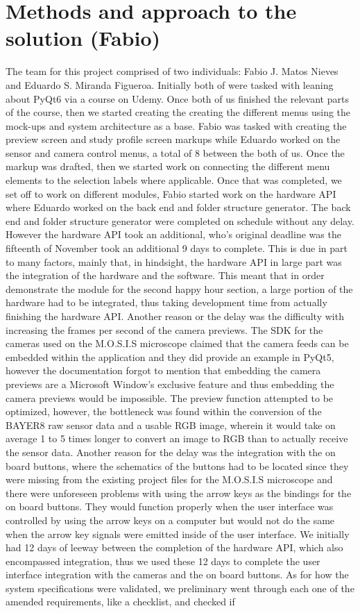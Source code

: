 \section{Methods and approach to the solution (Fabio)}
The team for this project comprised of two individuals: Fabio J. Matos Nieves and Eduardo S. Miranda Figueroa. Initially both of were tasked with leaning about PyQt6 via a course on Udemy. Once both of us finished the relevant parts of the course, then we started creating the creating the different menus using the mock-ups and system architecture as a base. Fabio was tasked with creating the preview screen and study profile screen markups while Eduardo worked on the sensor and camera control menus, a total of 8 between the both of us. Once the markup was drafted, then we started work on connecting the different menu elements to the selection labels where applicable. Once that was completed, we set off to work on different modules, Fabio started work on the hardware API where Eduardo worked on the back end and folder structure generator. The back end and folder structure generator were completed on schedule without any delay. However the hardware API took an additional, who's original deadline was the fifteenth of November took an additional 9 days to complete. This is due in part to many factors, mainly that, in hindsight, the hardware API in large part was the integration of the hardware and the software. This meant that in order demonstrate the module for the second happy hour section, a large portion of the hardware had to be integrated, thus taking development time from actually finishing the hardware API. Another reason or the delay was the difficulty with increasing the frames per second of the camera previews. The SDK for the cameras used on the M.O.S.I.S microscope claimed that the camera feeds can be embedded within the application and they did provide an example in PyQt5, however the documentation forgot to mention that embedding the camera previews are a Microsoft Window's exclusive feature and thus embedding the camera previews would be impossible. The preview function attempted to be optimized, however, the bottleneck was found within the conversion of the BAYER8 raw sensor data and a usable RGB image, wherein it would take on average 1 to 5 times longer to convert an image to RGB than to actually receive the sensor data. Another reason for the delay was the integration with the on board buttons, where the schematics of the buttons had to be located since they were missing from the existing project files for the M.O.S.I.S microscope and there were unforeseen problems with using the arrow keys as the bindings for the on board buttons. They would function properly when the user interface was controlled by using the arrow keys on a computer but would not do the same when the arrow key signals were emitted inside of the user interface. We initially had 12 days of leeway between the completion of the hardware API, which also encompassed integration, thus we used these 12 days to complete the user interface integration with the cameras and the on board buttons. As for how the system specifications were validated, we preliminary went through each one of the amended requirements, like a checklist, and checked if 